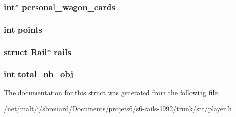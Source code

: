 \hypertarget{structPlayer_a2fe65be556aa052d9443725c575df02e}{
\subsubsection[{personal\-\_\-wagon\-\_\-cards}]{\setlength{\rightskip}{0pt plus 5cm}int$\ast$ personal\-\_\-wagon\-\_\-cards}}\label{structPlayer_a2fe65be556aa052d9443725c575df02e}
\hypertarget{structPlayer_af7f8f4a4e39e09fdb5e9f02330ecabef}{
\subsubsection[{points}]{\setlength{\rightskip}{0pt plus 5cm}int points}}\label{structPlayer_af7f8f4a4e39e09fdb5e9f02330ecabef}
\hypertarget{structPlayer_ac10a216b2c62ce10b7f08f2f9f4eb0b9}{
\subsubsection[{rails}]{\setlength{\rightskip}{0pt plus 5cm}struct {\bf Rail}$\ast$ rails}}\label{structPlayer_ac10a216b2c62ce10b7f08f2f9f4eb0b9}
\hypertarget{structPlayer_acc2384127a7ee30a148aed382793ac45}{
\subsubsection[{total\-\_\-nb\-\_\-obj}]{\setlength{\rightskip}{0pt plus 5cm}int total\-\_\-nb\-\_\-obj}}\label{structPlayer_acc2384127a7ee30a148aed382793ac45}


The documentation for this struct was generated from the following file\-:\begin{DoxyCompactItemize}
\item 
/net/malt/i/sbrouard/\-Documents/projets6/s6-\/rails-\/1992/trunk/src/\hyperlink{player_8h}{player.\-h}\end{DoxyCompactItemize}
